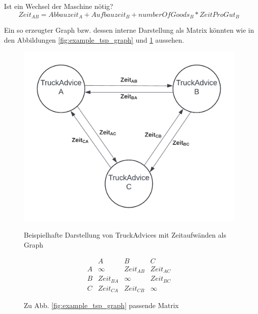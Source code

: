 Ist ein Wechsel der Maschine nötig?\\
\begin{equation} \label{eq:tspCost2}
    Zeit_{AB} = Abbauzeit_A + Aufbauzeit_B + numberOfGoods_B * ZeitProGut_B
\end{equation}

Ein so erzeugter Graph bzw. dessen interne Darstellung als Matrix könnten wie in den Abbildungen \ref{fig:example_tsp_graph} und \ref{fig:example_tsp_matrix} aussehen.

\begin{figure}[H]
\centering
\begin{minipage}{.6\textwidth}
  \centering
  \includegraphics[width=\linewidth]{images/ExampleTSPGraph.png}
  \caption{Beispielhafte Darstellung von TruckAdvices mit Zeitaufwänden als Graph}
  \label{fig:example_tsp_graph}
\end{minipage}%
\begin{minipage}{.4\textwidth}
  \centering
    \[
    \begin{matrix}
         & A & B & C\\
        A & \infty & Zeit_{AB} & Zeit_{AC}\\
        B & Zeit_{BA} & \infty & Zeit_{BC}\\
        C & Zeit_{CA} & Zeit_{CB} & \infty
    \end{matrix}
    \]
  \caption{Zu Abb. \ref{fig:example_tsp_graph} passende Matrix}
  \label{fig:example_tsp_matrix}
\end{minipage}
\end{figure}



